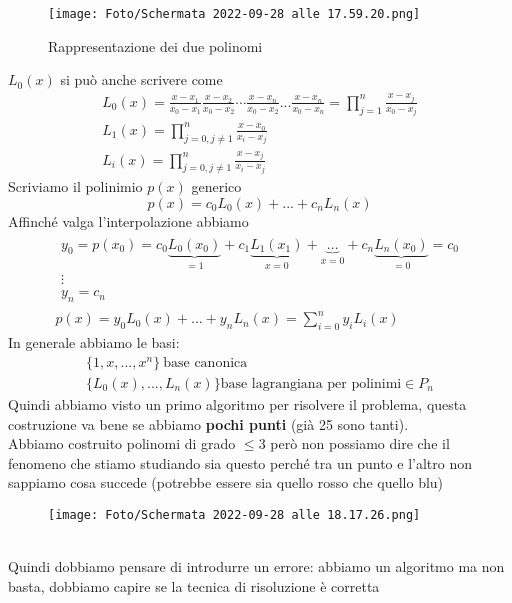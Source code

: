 \documentclass[a4paper, portrait]{book}
\numberwithin{equation}{chapter} %
\begin{document}
\begin{figure}
    \centering
    \texttt{[image: Foto/Schermata 2022-09-28 alle 17.59.20.png]}
    \caption{Rappresentazione dei due polinomi}
\end{figure}
$L_0(x)$ si può anche scrivere come
\begin{gather}
    L_0(x) = \frac{x-x_1}{x_0-x_1}\frac{x-x_2}{x_0-x_2}\cdots \frac{x-x_n}{x_0-x_2}...\frac{x-x_n}{x_0-x_n} = \prod_{j=1}^{n} \frac{x-x_j}{x_0-x_j}\\
    L_1(x) = \prod_{j=0, j \neq 1}^{n} \frac{x-x_0}{x_i-x_j}\\
    L_i(x) = \prod_{j=0, j\neq 1}^n \frac{x-x_j}{x_i-x_j}
\end{gather}
Scriviamo il polinimio $p(x)$ generico
\begin{equation}
    p(x) = c_0 L_0(x) + ... + c_n L_n(x)
\end{equation}
Affinché valga l'interpolazione abbiamo
\begin{gather}
    \begin{matrix}
        y_0 = p(x_0) = c_0 \underbrace{L_0(x_0)}_{=1}+ c_1 \underbrace{L_1(x_1)}_{x=0}+\underbrace{\dots}_{x=0}+c_n\underbrace{L_n(x_0)}_{=0} = c_0\\
        \vdots\\
        y_n = c_n
    \end{matrix}\\
    p(x) = y_0 L_0(x) + ... + y_nL_n(x) = \sum_{i=0}^{n}y_i L_i(x)
\end{gather}
In generale abbiamo le basi:
\begin{gather}
    \{1,x,...,x^n\}\ \text{base canonica}\\
    \{L_0(x),...,L_n(x)\} \text{base lagrangiana per polinimi} \in P_n
\end{gather}
\newpage
Quindi abbiamo visto un primo algoritmo per risolvere il problema, questa costruzione va bene se abbiamo \textbf{pochi punti} (già 25 sono tanti).\\
Abbiamo costruito polinomi di grado $\leq 3$ però non possiamo dire che il fenomeno che stiamo studiando sia questo perché tra un punto e l'altro non sappiamo cosa succede (potrebbe essere sia quello rosso che quello blu)
\begin{figure}[h!]
    \centering
    \texttt{[image: Foto/Schermata 2022-09-28 alle 18.17.26.png]}
    \caption{}
\end{figure}
\\Quindi dobbiamo pensare di introdurre un errore: abbiamo un algoritmo ma non basta, dobbiamo capire se la tecnica di risoluzione è corretta
\end{document}

